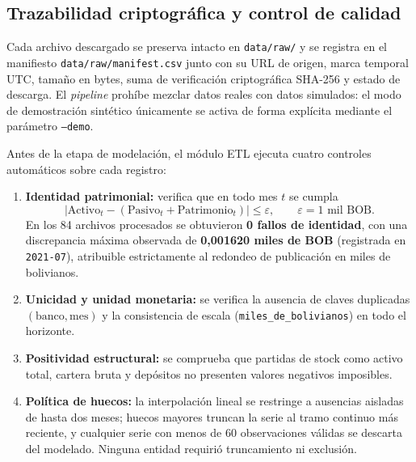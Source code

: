 \documentclass[11pt,letterpaper]{article}
\begin{document}
\subsection{Trazabilidad criptográfica y control de calidad}

Cada archivo descargado se preserva intacto en \texttt{data/raw/} y se registra en el manifiesto \texttt{data/raw/manifest.csv} junto con su URL de origen, marca temporal UTC, tamaño en bytes, suma de verificación criptográfica SHA-256 y estado de descarga. El \emph{pipeline} prohíbe mezclar datos reales con datos simulados: el modo de demostración sintético únicamente se activa de forma explícita mediante el parámetro \texttt{--demo}.

Antes de la etapa de modelación, el módulo ETL ejecuta cuatro controles automáticos sobre cada registro:
\begin{enumerate}[leftmargin=1.5em]
  \item \textbf{Identidad patrimonial:} verifica que en todo mes \(t\) se cumpla
  \[
  \left|\text{Activo}_t - \left(\text{Pasivo}_t + \text{Patrimonio}_t\right)\right| \le \varepsilon, \qquad \varepsilon = 1\text{ mil BOB}.
  \]
  En los 84 archivos procesados se obtuvieron \textbf{0 fallos de identidad}, con una discrepancia máxima observada de \textbf{0{,}001620 miles de BOB} (registrada en \texttt{2021-07}), atribuible estrictamente al redondeo de publicación en miles de bolivianos.
  \item \textbf{Unicidad y unidad monetaria:} se verifica la ausencia de claves duplicadas \((\text{banco}, \text{mes})\) y la consistencia de escala (\texttt{miles\_de\_bolivianos}) en todo el horizonte.
  \item \textbf{Positividad estructural:} se comprueba que partidas de stock como activo total, cartera bruta y depósitos no presenten valores negativos imposibles.
  \item \textbf{Política de huecos:} la interpolación lineal se restringe a ausencias aisladas de hasta dos meses; huecos mayores truncan la serie al tramo continuo más reciente, y cualquier serie con menos de 60 observaciones válidas se descarta del modelado. Ninguna entidad requirió truncamiento ni exclusión.
\end{enumerate}
\end{document}
